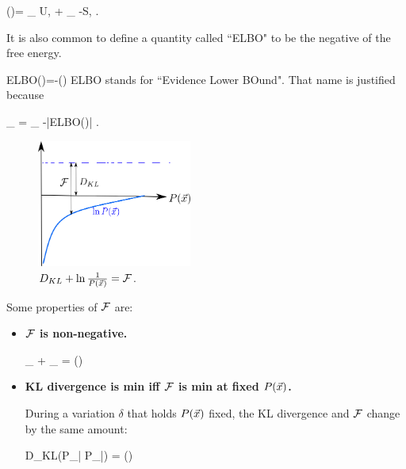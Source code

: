 \beq 
\calf(\vecx)=
_
{U, }
+
_
{-S, }
\;.
\eeq

It is also common to define a
quantity called ``ELBO" to be the negative
of the free energy.

\beq
ELBO(\vecx)=-\calf(\vecx)
\eeq
ELBO stands for ``Evidence Lower BOund".
That name
is justified because

\beq
{}
_{ }
=
_{}
-|ELBO(\vecx)|
\;.
\eeq

\begin{figure}[h!]
\centering
\includegraphics[width=2in]
{var-bay/elbo.png}
\caption{
$D_{KL}+\ln \frac{1}{P({\vec{x}})}={\cal F}$.
}
\label{fig-elbo}
\end{figure}

Some properties of ${\cal F}$ are:
\begin{itemize}

\item{\bf  ${\cal F}$ is non-negative.}

\beq
{}_{}
+ \underbrace{\ln\frac{1}
{ P_{\vec{\rvx}}(\vecx)]}}_{}
= \calf(\vecx)
\eeq



\item {\bf KL divergence is  min  iff ${\cal F}$ is min
at fixed $P({\vec{x}})$.}

During a variation $\delta$ that holds
$P({\vec{x}})$ fixed, 
the KL divergence and ${\cal F}$ change
by the same amount:

\beq
\delta D_{KL}(P_{\rvq|\vec{\rvx}}\parallel
P_{\rvh|\vec{\rvx}})
=
\delta \calf(\vecx)
\eeq

\end{itemize}



